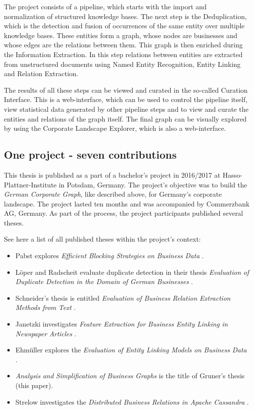 \documentclass[
  a4paper,     %
  titlepage,   %
  oneside,     %
  parskip      %
]{scrartcl}          %
\begin{document}
    The project consists of a pipeline, which starts with the import and normalization of structured knowledge bases. The next step is the Deduplication, which is the detection and fusion of occurrences of the same entity over multiple knowledge bases. These entities form a graph, whose nodes are businesses and whose edges are the relations between them. This graph is then enriched during the Information Extraction. In this step relations between entities are extracted from unstructured documents using Named Entity Recognition, Entity Linking and Relation Extraction.

    The results of all these steps can be viewed and curated in the so-called Curation Interface. This is a web-interface, which can be used to control the pipeline itself, view statistical data generated by other pipeline steps and to view and curate the entities and relations of the graph itself. The final graph can be visually explored by using the Corporate Landscape Explorer, which is also a web-interface.

    \subsection{One project - seven contributions}

    This thesis is published as a part of a bachelor's project in 2016/2017 at Hasso-Plattner-Institute in Potsdam, Germany. The project's objective was to build the \emph {German Corporate Graph}, like described above, for Germany's corporate landscape. The project lasted ten months and was accompanied by Commerzbank AG, Germany. As part of the process, the project participants published several theses.

    \medskip

    See here a list of all published theses within the project's context:

    \begin{itemize}
    \item Pabst explores \emph{Efficient Blocking Strategies on Business Data} \cite{pabst}.
    \item Löper and Radscheit evaluate duplicate detection in their thesis \emph{Evaluation of Duplicate Detection in the Domain of German Businesses} \cite{loeperradscheit}.
    \item Schneider's thesis is entitled \emph{Evaluation of Business Relation Extraction Methods from Text} \cite{schneider}.
    \item Janetzki investigates \emph{Feature Extraction for Business Entity Linking in Newspaper Articles} \cite{janetzki}.
    \item Ehmüller explores the \emph{Evaluation of Entity Linking Models on Business Data} \cite{ehmueller}.
    \item \emph{Analysis and Simplification of Business Graphs} is the title of Gruner's thesis (this paper).
    \item Strelow investigates the \emph{Distributed Business Relations in Apache Cassandra} \cite{strelow}.

    \end{itemize}
\end{document}
